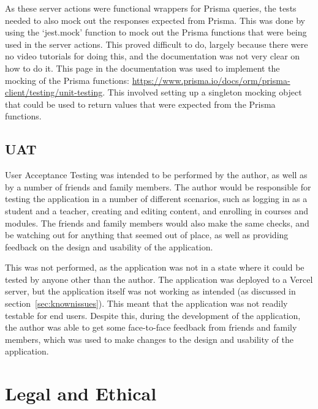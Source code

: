 \documentclass[11pt, a4paper,twoside]{report}
\theoremstyle{plain} %
\theoremstyle{definition} %
\numberwithin{equation}{chapter}
\begin{document}
As these server actions were functional wrappers for Prisma queries, the tests
needed to also mock out the responses expected from Prisma. This was done by
using the `jest.mock' function to mock out the Prisma functions that were being
used in the server actions. This proved difficult to do, largely because there
were no video tutorials for doing this, and the documentation was not very
clear on how to do it. This page in the documentation was used to implement the
mocking of the Prisma functions:
\url{https://www.prisma.io/docs/orm/prisma-client/testing/unit-testing}. This
involved setting up a singleton mocking object that could be used to return
values that were expected from the Prisma functions.

\section{UAT}\label{sec:usertesting}

User Acceptance Testing was intended to be performed by the author, as well as
by a number of friends and family members. The author would be responsible for
testing the application in a number of different scenarios, such as logging in
as a student and a teacher, creating and editing content, and enrolling in
courses and modules. The friends and family members would also make the same
checks, and be watching out for anything that seemed out of place, as well as
providing feedback on the design and usability of the application.

This was not performed, as the application was not in a state where it could be
tested by anyone other than the author. The application was deployed to a
Vercel server, but the application itself was not working as intended (as
discussed in section~\ref{sec:knownissues}). This meant that the application
was not readily testable for end users. Despite this, during the development of
the application, the author was able to get some face-to-face feedback from
friends and family members, which was used to make changes to the design and
usability of the application.

\chapter{Legal and Ethical}\label{ch:legalandethical}
\end{document}
